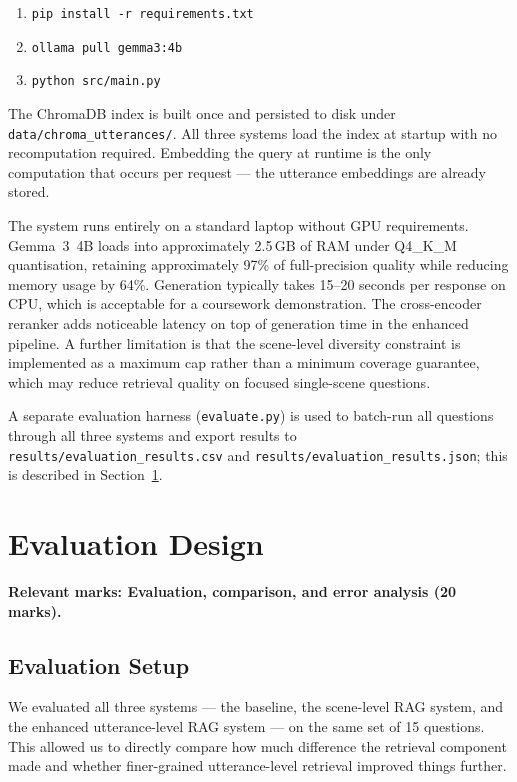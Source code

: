 \documentclass[10pt,conference]{IEEEtran}
\begin{document}
\begin{enumerate}
    \item \texttt{pip install -r requirements.txt}
    \item \texttt{ollama pull gemma3:4b}
    \item \texttt{python src/main.py}
\end{enumerate}

The ChromaDB index is built once and persisted to disk under
\texttt{data/chroma\_utterances/}. All three systems load the index
at startup with no recomputation required. Embedding the query at
runtime is the only computation that occurs per request --- the
utterance embeddings are already stored.

The system runs entirely on a standard laptop without GPU
requirements. Gemma~3~4B loads into approximately 2.5\,GB of RAM
under Q4\_K\_M quantisation, retaining approximately 97\% of
full-precision quality while reducing memory usage by 64\%.
Generation typically takes 15--20 seconds per response on CPU,
which is acceptable for a coursework demonstration. The
cross-encoder reranker adds noticeable latency on top of generation
time in the enhanced pipeline. A further limitation is that the
scene-level diversity constraint is implemented as a maximum cap
rather than a minimum coverage guarantee, which may reduce retrieval
quality on focused single-scene questions.

A separate evaluation harness (\texttt{evaluate.py}) is used to
batch-run all questions through all three systems and export
results to \texttt{results/evaluation\_results.csv} and
\texttt{results/evaluation\_results.json}; this is described in
Section~\ref{sec:evaluation}.

\section{Evaluation Design}
\label{sec:evaluation}

\textbf{Relevant marks: Evaluation, comparison, and error analysis
(20 marks).}

\subsection{Evaluation Setup}

We evaluated all three systems --- the baseline, the scene-level
RAG system, and the enhanced utterance-level RAG system --- on the
same set of 15 questions. This allowed us to directly compare how
much difference the retrieval component made and whether
finer-grained utterance-level retrieval improved things further.
\end{document}
